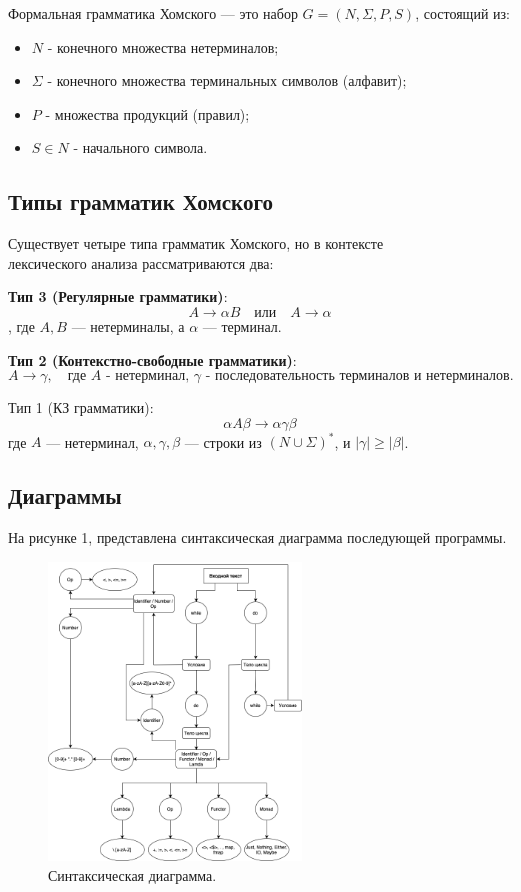 \documentclass[areasetadvanced]{scrartcl}
\begin{document}
Формальная грамматика Хомского — это набор \( G = (N, \Sigma, P, S) \), состоящий из:
\begin{itemize}
    \item \( N \) - конечного множества нетерминалов;
    \item \( \Sigma \) - конечного множества терминальных символов (алфавит);
    \item \( P \) - множества продукций (правил);
    \item \( S \in N \) - начального символа.
\end{itemize}

\subsection{Типы грамматик Хомского}

Существует четыре типа грамматик Хомского, но в контексте\\ лексического анализа рассматриваются два:

\textbf{Тип 3 (Регулярные грамматики)}:
\[
A \rightarrow \alpha B \quad \text{или} \quad A \rightarrow \alpha
\]
, где \( A, B \) — нетерминалы, а \( \alpha \) — терминал.

\textbf{Тип 2 (Контекстно-свободные грамматики)}:
\[
A \rightarrow \gamma, \quad \text{где } A \text{ - нетерминал, } \gamma \text{ - последовательность терминалов и нетерминалов.}
\]

Тип 1 (КЗ грамматики):
\[
\alpha A \beta \rightarrow \alpha \gamma \beta
\]
где \( A \) — нетерминал, \( \alpha, \gamma, \beta \) — строки из \( (N \cup \Sigma)^* \), и \( |\gamma| \geq |\beta| \).

\newpage
\subsection{Диаграммы}

На рисунке 1, представлена синтаксическая диаграмма последующей программы.

    \begin{figure}[h]
        \centering
        \includegraphics[width=0.6\textwidth]{СинтДиагр.drawio.png}
        \caption{Синтаксическая диаграмма.}
        \label{fig:syntdiag}
    \end{figure}
\end{document}
